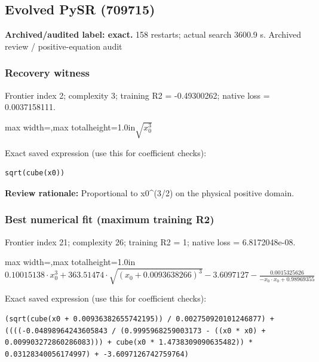 \documentclass[10pt,letterpaper,landscape]{article}
\begin{document}
\begin{minipage}[t]{0.485\textwidth}
\subsection*{Evolved PySR (709715)}
\textbf{Archived/audited label: exact.} 158 restarts; actual search 3600.9 s.
{\small Archived review / positive-equation audit}
\subsubsection*{Recovery witness}
Frontier index 2; complexity 3; training R2 = -0.49300262; native loss = 0.0037158111.
\begin{center}\begin{adjustbox}{max width=\linewidth,max totalheight=1.0in}$\displaystyle \sqrt{x_{0}^{3}}$\end{adjustbox}\end{center}
{\scriptsize Exact saved expression (use this for coefficient checks):}
\begin{lstlisting}
sqrt(cube(x0))
\end{lstlisting}
{\small\textbf{Review rationale:} Proportional to x0\textasciicircum{}(3/2) on the physical positive domain.}
\subsubsection*{Best numerical fit (maximum training R2)}
Frontier index 21; complexity 26; training R2 = 1; native loss = 6.8172048e-08.
\begin{center}\begin{adjustbox}{max width=\linewidth,max totalheight=1.0in}$\displaystyle 0.10015138 \cdot x_{0}^{3} + 363.51474 \cdot \sqrt{\left(x_{0} + 0.0093638266\right)^{3}} - 3.6097127 - \frac{0.0015325626}{- x_{0} \cdot x_{0} + 0.98969355}$\end{adjustbox}\end{center}
{\scriptsize Exact saved expression (use this for coefficient checks):}
\begin{lstlisting}
(sqrt(cube(x0 + 0.00936382655742195)) / 0.002750920101246877) + ((((-0.04898964243605843 / (0.9995968259003173 - ((x0 * x0) + 0.009903272860286083))) + cube(x0 * 1.4738309090635482)) * 0.03128340056174997) + -3.6097126742759764)
\end{lstlisting}
\end{minipage}
\clearpage{}\label{kepler-10008}
\end{document}
